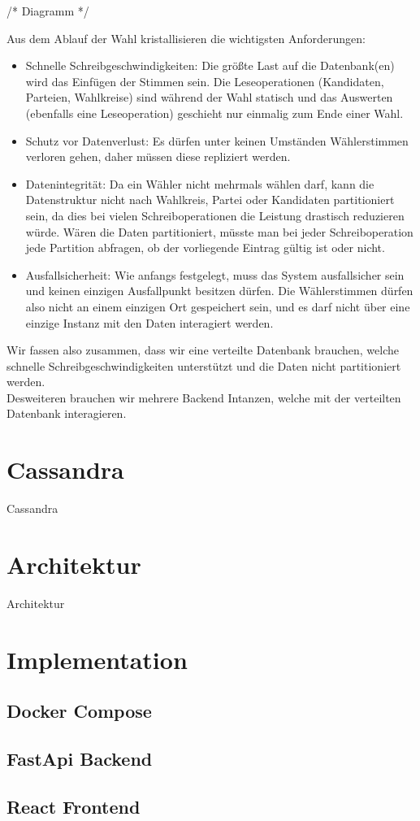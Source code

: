 \documentclass{article}  %
\begin{document}
/* Diagramm */ 

Aus dem Ablauf der Wahl kristallisieren die wichtigsten Anforderungen: \\
\begin{itemize}
    \item Schnelle Schreibgeschwindigkeiten: Die größte Last auf die Datenbank(en) wird das Einfügen der Stimmen sein. Die Leseoperationen (Kandidaten, Parteien, Wahlkreise) sind während der Wahl statisch und das Auswerten (ebenfalls eine Leseoperation) geschieht nur einmalig zum Ende einer Wahl. 

    \item Schutz vor Datenverlust: Es dürfen unter keinen Umständen Wählerstimmen verloren gehen, daher müssen diese repliziert werden.

    \item Datenintegrität: Da ein Wähler nicht mehrmals wählen darf, kann die Datenstruktur nicht nach Wahlkreis, Partei oder Kandidaten partitioniert sein, da dies bei vielen Schreiboperationen die Leistung drastisch reduzieren würde. Wären die Daten partitioniert, müsste man bei jeder Schreiboperation jede Partition abfragen, ob der vorliegende Eintrag gültig ist oder nicht.

    \item Ausfallsicherheit: Wie anfangs festgelegt, muss das System ausfallsicher sein und keinen einzigen Ausfallpunkt besitzen dürfen. Die Wählerstimmen dürfen also nicht an einem einzigen Ort gespeichert sein, und es darf nicht über eine einzige Instanz mit den Daten interagiert werden.
 
\end{itemize} 

Wir fassen also zusammen, dass wir eine verteilte Datenbank brauchen, welche schnelle Schreibgeschwindigkeiten unterstützt und die Daten nicht partitioniert werden. \\
Desweiteren brauchen wir mehrere Backend Intanzen, welche mit der verteilten Datenbank interagieren. \\

\newpage
\section{Cassandra}
Cassandra

\newpage
\section{Architektur}
Architektur


\newpage
\section{Implementation}
\subsection{Docker Compose}
\subsection{FastApi Backend}
\subsection{React Frontend}
\newpage
\end{document}
